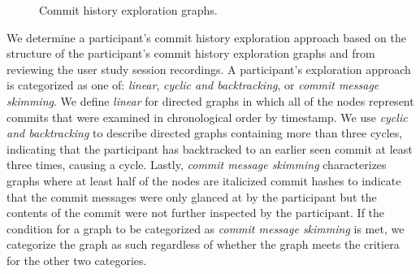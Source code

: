 \begin{figure}[h]
  \centering%
  \qquad
  \caption{
    Commit history exploration graphs.
  }%
  \label{fig:Exploration-Graphs}%
\end{figure}

We determine a participant's commit history exploration approach based on the structure 
of the participant's commit history exploration graphs and from reviewing the user study session recordings.
A participant's exploration approach is categorized as one of:
\textit{linear}, \textit{cyclic and backtracking}, or \textit{commit message skimming}.
We define \textit{linear} for directed graphs in which all of the nodes represent commits 
that were examined in chronological order by timestamp. 
We use \textit{cyclic and backtracking} to describe directed graphs 
containing more than three cycles, indicating that the participant has backtracked to
an earlier seen commit at least three times, causing a cycle. 
Lastly, \textit{commit message skimming} characterizes graphs where 
at least half of the nodes are italicized commit hashes to indicate
that the commit messages were only glanced at by the participant but the
contents of the commit were not further inspected by the participant.
If the condition for a graph to be categorized as \textit{commit message skimming} is met,
we categorize the graph as such regardless of whether the graph meets the critiera for the other two categories.

